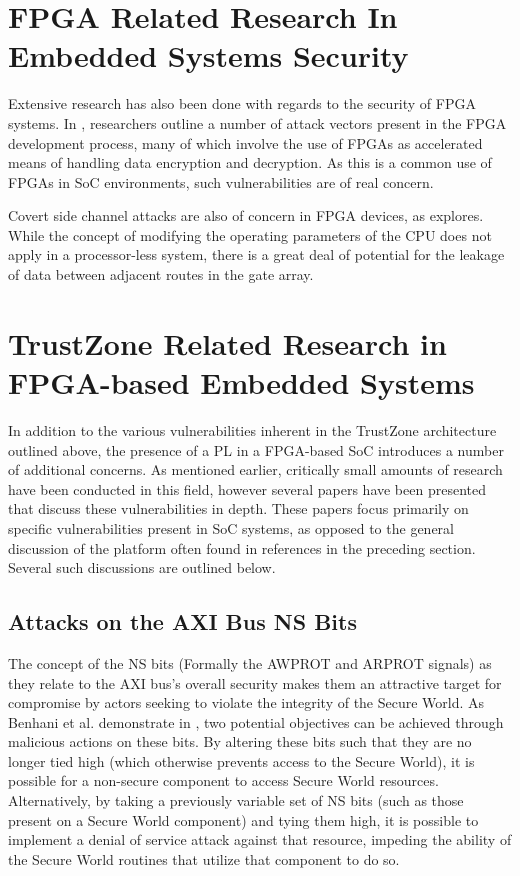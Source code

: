 \documentclass[journal]{IEEEtran}
\begin{document}
\section{FPGA Related Research In Embedded Systems Security} \label{sec:FPGA Research}
Extensive research has also been done with regards to the security of FPGA systems. In
\cite{badrignans_security_2011}, researchers outline a number of attack vectors present in
the FPGA development process, many of which involve the use of FPGAs as accelerated means
of handling data encryption and decryption. As this is a common use of FPGAs in SoC
environments, such vulnerabilities are of real concern. 

Covert side channel attacks are also of concern in FPGA devices, as 
\cite{giechaskiel_leaky_2018} explores. While the concept of modifying the operating
parameters of the CPU does not apply in a processor-less system, there is a great deal of
potential for the leakage of data between adjacent routes in the gate array.

\section{TrustZone Related Research in FPGA-based Embedded Systems} 
\label{sec:SoC Research}
In addition to the various vulnerabilities inherent in the TrustZone architecture outlined
above, the presence of a PL in a FPGA-based SoC introduces a number of
additional concerns. As mentioned earlier, critically small amounts of research
have been conducted in this field, however several papers have been presented that discuss
these vulnerabilities in depth. These papers focus primarily on specific vulnerabilities
present in SoC systems, as opposed to the general discussion of the platform often found
in references in the preceding section. Several such discussions are outlined below.

\subsection{Attacks on the AXI Bus NS Bits} \label{sec:NS attacks}
The concept of the NS bits (Formally the AWPROT and ARPROT signals) as they relate to the
AXI bus's overall security makes them an attractive target for compromise by actors 
seeking to violate the integrity of the Secure World. As Benhani et al. demonstrate in 
\cite{benhani_security_2019}, two potential objectives can be achieved through malicious 
actions on these bits. By altering these bits such that they are no longer tied high 
(which otherwise prevents access to the Secure World), it is possible for a non-secure 
component to access Secure World resources. Alternatively, by taking a previously variable
set of NS bits (such as those present on a Secure World component) and tying them high, it
is possible to implement a denial of service attack against that resource, impeding the 
ability of the Secure World routines that utilize that component to do so.
\end{document}
